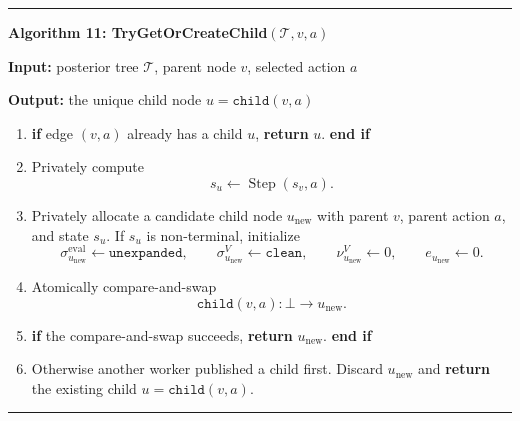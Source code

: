 \documentclass[11pt]{article}
\newcommand{\Tree}{\mathcal{T}}
\newcommand{\Step}{\operatorname{Step}}
\newenvironment{algorithmblock}[1]
{
  \par\medskip
  \noindent\hrule\par\smallskip
  \noindent\textbf{#1}
  \par\smallskip
}
{
  \par\smallskip\noindent\hrule\par\medskip
}
\newcommand{\Input}{\textbf{Input: }}
\newcommand{\Output}{\textbf{Output: }}
\newcommand{\Return}{\textbf{return }}
\newcommand{\If}{\textbf{if }}
\newcommand{\EndIf}{\textbf{end if}}
\begin{document}
\begin{algorithmblock}{Algorithm 11: TryGetOrCreateChild\((\Tree,v,a)\)}

\Input posterior tree \(\Tree\), parent node \(v\), selected action \(a\)

\Output the unique child node \(u=\texttt{child}(v,a)\)

\begin{enumerate}[leftmargin=2em]
  \item \If edge \((v,a)\) already has a child \(u\), \Return \(u\). \EndIf

  \item Privately compute
  \[
  s_u\gets\Step(s_v,a).
  \]

  \item Privately allocate a candidate child node \(u_{\mathrm{new}}\) with
  parent \(v\), parent action \(a\), and state \(s_u\). If \(s_u\) is
  non-terminal, initialize
  \[
  \sigma^{\mathrm{eval}}_{u_{\mathrm{new}}}\gets\texttt{unexpanded},
  \qquad
  \sigma^V_{u_{\mathrm{new}}}\gets\texttt{clean},
  \qquad
  \nu^V_{u_{\mathrm{new}}}\gets 0,
  \qquad
  e_{u_{\mathrm{new}}}\gets 0.
  \]

  \item Atomically compare-and-swap
  \[
  \texttt{child}(v,a):\bot\rightarrow u_{\mathrm{new}}.
  \]

  \item \If the compare-and-swap succeeds, \Return \(u_{\mathrm{new}}\). \EndIf

  \item Otherwise another worker published a child first. Discard
  \(u_{\mathrm{new}}\) and \Return the existing child \(u=\texttt{child}(v,a)\).
\end{enumerate}

\end{algorithmblock}
\end{document}
